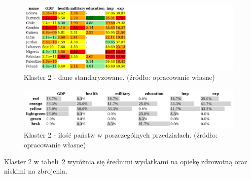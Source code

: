 \documentclass[11pt]{report}
\begin{document}
    \begin{figure}[!htp]
        \centering
        \includegraphics[width=1 \textwidth]{tables/CLUST/cluster2stdkmeans.png}
        \caption{Klaster 2 - dane standaryzowane. (źródło: opracowanie własne)}
        \label{tab:cl2std}
    \end{figure}

    \begin{figure}[!htp]
        \centering
        \includegraphics[width=1 \textwidth]{tables/CLUST/cluster2stdkmeanscount.png}
        \caption{Klaster 2 - ilość państw w poszczególnych przedziałach. (źródło: opracowanie własne)}
        \label{tab:cl2stdcount}
    \end{figure}

    Klaster 2 w tabeli~\ref{tab:cl2stdcount} wyróżnia się średnimi wydatkami na opiekę zdrowotną oraz niskimi na zbrojenia.

    
\end{document}
